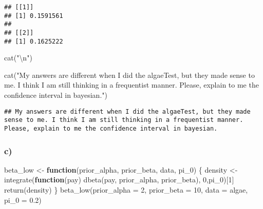 \documentclass[
]{article}
\newenvironment{Shaded}{\begin{snugshade}}{\end{snugshade}}
\newcommand{\AttributeTok}[1]{\textcolor[rgb]{0.77,0.63,0.00}{#1}}
\newcommand{\ControlFlowTok}[1]{\textcolor[rgb]{0.13,0.29,0.53}{\textbf{#1}}}
\newcommand{\DecValTok}[1]{\textcolor[rgb]{0.00,0.00,0.81}{#1}}
\newcommand{\FloatTok}[1]{\textcolor[rgb]{0.00,0.00,0.81}{#1}}
\newcommand{\FunctionTok}[1]{\textcolor[rgb]{0.00,0.00,0.00}{#1}}
\newcommand{\NormalTok}[1]{#1}
\newcommand{\OtherTok}[1]{\textcolor[rgb]{0.56,0.35,0.01}{#1}}
\newcommand{\SpecialCharTok}[1]{\textcolor[rgb]{0.00,0.00,0.00}{#1}}
\newcommand{\StringTok}[1]{\textcolor[rgb]{0.31,0.60,0.02}{#1}}
\begin{document}
\begin{verbatim}
## [[1]]
## [1] 0.1591561
## 
## [[2]]
## [1] 0.1625222
\end{verbatim}

\begin{Shaded}
\begin{Highlighting}[]
\FunctionTok{cat}\NormalTok{(}\StringTok{"}\SpecialCharTok{\textbackslash{}n}\StringTok{"}\NormalTok{)}
\end{Highlighting}
\end{Shaded}

\begin{Shaded}
\begin{Highlighting}[]
\FunctionTok{cat}\NormalTok{(}\StringTok{"My answers are different when I did the algaeTest, but they made sense to me. I think I am still thinking in a frequentist manner. Please, explain to me the confidence interval in bayesian."}\NormalTok{)}
\end{Highlighting}
\end{Shaded}

\begin{verbatim}
## My answers are different when I did the algaeTest, but they made sense to me. I think I am still thinking in a frequentist manner. Please, explain to me the confidence interval in bayesian.
\end{verbatim}

\hypertarget{c}{%
\subsubsection{c)}\label{c}}

\begin{Shaded}
\begin{Highlighting}[]
\NormalTok{beta\_low }\OtherTok{\textless{}{-}} \ControlFlowTok{function}\NormalTok{(prior\_alpha,}
\NormalTok{                     prior\_beta,}
\NormalTok{                     data,}
\NormalTok{                     pi\_0) \{}
\NormalTok{  density }\OtherTok{\textless{}{-}} \FunctionTok{integrate}\NormalTok{(}\ControlFlowTok{function}\NormalTok{(pay) }\FunctionTok{dbeta}\NormalTok{(pay, prior\_alpha, prior\_beta), }\DecValTok{0}\NormalTok{,pi\_0)[}\DecValTok{1}\NormalTok{]}
  \FunctionTok{return}\NormalTok{(density)}
\NormalTok{\}}
\FunctionTok{beta\_low}\NormalTok{(}\AttributeTok{prior\_alpha =} \DecValTok{2}\NormalTok{,}
         \AttributeTok{prior\_beta  =} \DecValTok{10}\NormalTok{,}
         \AttributeTok{data =}\NormalTok{ algae,}
         \AttributeTok{pi\_0 =} \FloatTok{0.2}\NormalTok{)}
\end{Highlighting}
\end{Shaded}
\end{document}
